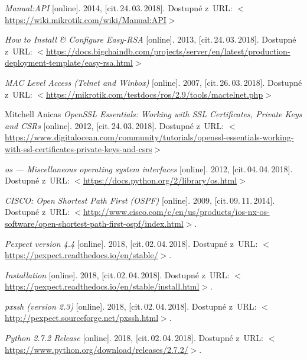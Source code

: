\begin{literatura}{99}

      \emph{Manual:API}\/ [online].
    2014,  [cit.\,24.\,03.\,2018].
    Dostupné z~URL:
    \(<\)\url{https://wiki.mikrotik.com/wiki/Manual:API}\(>\)			
    
      \emph{How to Install & Configure Easy-RSA}\/ [online].
    2013,  [cit.\,24.\,03.\,2018].
    Dostupné z~URL:
    \(<\)\url{https://docs.bigchaindb.com/projects/server/en/latest/production-deployment-template/easy-rsa.html}\(>\)

      \emph{MAC Level Access (Telnet and Winbox)}\/ [online].
    2007,  [cit.\,26.\,03.\,2018].
    Dostupné z~URL:
    \(<\)\url{https://mikrotik.com/testdocs/ros/2.9/tools/mactelnet.php}\(>\)

     Mitchell Anicas \emph{OpenSSL Essentials: Working with SSL Certificates, Private Keys and CSRs}\/ [online].
    2012,  [cit.\,24.\,03.\,2018].
    Dostupné z~URL:
    \(<\)\url{https://www.digitalocean.com/community/tutorials/openssl-essentials-working-with-ssl-certificates-private-keys-and-csrs}\(>\)		

      \emph{os — Miscellaneous operating system interfaces}\/ [online].
    2012,  [cit.\,04.\,04.\,2018].
    Dostupné z~URL:
    \(<\)\url{https://docs.python.org/2/library/os.html}\(>\)		

    \emph{CISCO: Open Shortest Path First (OSPF)}\/ [online].
    2009,  [cit.\,09.\,11.\,2014].
    Dostupné z~URL:
    \(<\)\url{http://www.cisco.com/c/en/us/products/ios-nx-os-software/open-shortest-path-first-ospf/index.html}\(>\).	

    \emph{Pexpect version 4.4}\/ [online].
    2018,  [cit.\,02.\,04.\,2018].
    Dostupné z~URL:
    \(<\)\url{https://pexpect.readthedocs.io/en/stable/}\(>\).	
    
    \emph{Installation}\/ [online].
    2018,  [cit.\,02.\,04.\,2018].
    Dostupné z~URL:
    \(<\)\url{https://pexpect.readthedocs.io/en/stable/install.html}\(>\).	
    
    \emph{pxssh (version 2.3)}\/ [online].
    2018,  [cit.\,02.\,04.\,2018].
    Dostupné z~URL:
    \(<\)\url{http://pexpect.sourceforge.net/pxssh.html}\(>\).

    \emph{Python 2.7.2 Release}\/ [online].
    2018,  [cit.\,02.\,04.\,2018].
    Dostupné z~URL:
    \(<\)\url{https://www.python.org/download/releases/2.7.2/}\(>\).	
        

\end{literatura}
